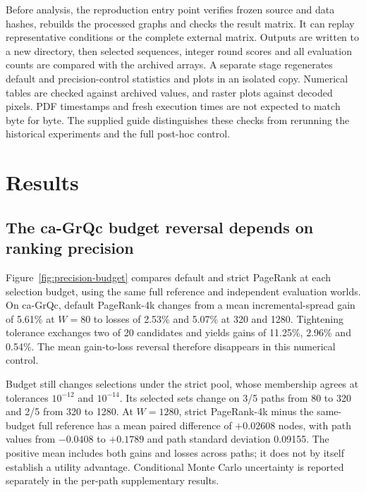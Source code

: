 \documentclass[smallextended]{svjour3}
\begin{document}
Before analysis, the reproduction entry point verifies frozen source and data hashes, rebuilds the processed graphs and checks the result matrix. It can replay representative conditions or the complete external matrix. Outputs are written to a new directory, then selected sequences, integer round scores and all evaluation counts are compared with the archived arrays. A separate stage regenerates default and precision-control statistics and plots in an isolated copy. Numerical tables are checked against archived values, and raster plots against decoded pixels. PDF timestamps and fresh execution times are not expected to match byte for byte. The supplied guide distinguishes these checks from rerunning the historical experiments and the full post-hoc control.

\section{Results}
\subsection{The ca-GrQc budget reversal depends on ranking precision}
Figure~\ref{fig:precision-budget} compares default and strict PageRank at each selection budget, using the same full reference and independent evaluation worlds. On ca-GrQc, default PageRank-4k changes from a mean incremental-spread gain of 5.61\% at $W=80$ to losses of 2.53\% and 5.07\% at 320 and 1280. Tightening tolerance exchanges two of 20 candidates and yields gains of 11.25\%, 2.96\% and 0.54\%. The mean gain-to-loss reversal therefore disappears in this numerical control.

Budget still changes selections under the strict pool, whose membership agrees at tolerances $10^{-12}$ and $10^{-14}$. Its selected sets change on 3/5 paths from 80 to 320 and 2/5 from 320 to 1280. At $W=1280$, strict PageRank-4k minus the same-budget full reference has a mean paired difference of $+0.02608$ nodes, with path values from $-0.0408$ to $+0.1789$ and path standard deviation 0.09155. The positive mean includes both gains and losses across paths; it does not by itself establish a utility advantage. Conditional Monte Carlo uncertainty is reported separately in the per-path supplementary results.
\end{document}
